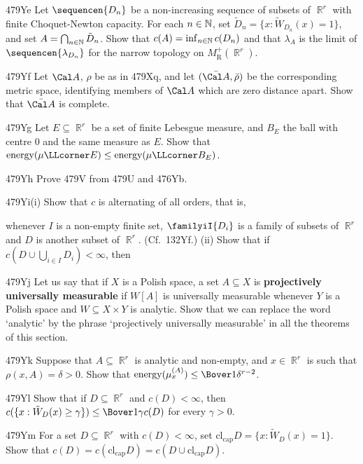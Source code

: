 {\spheader 479Ye
Let $\sequencen{D_n}$ be a non-increasing sequence of
subsets of $\BbbR^r$ with finite Choquet-Newton capacity.
For each $n\in\Bbb N$, set $\tilde D_n=\{x:\tilde W_{D_n}(x)=1\}$, and set
$A=\bigcap_{n\in\Bbb N}\tilde D_n$.   Show that
$c(A)=\inf_{n\in\Bbb N}c(D_n)$ and that $\lambda_A$ is the limit of
$\sequencen{\lambda_{D_n}}$ for the narrow topology on
$M^+_{\text{R}}(\BbbR^r)$.

\spheader 479Yf Let $\Cal A$, $\rho$ be as in 479Xq, and let
$(\bar{\Cal A},\bar\rho)$ be the corresponding metric space, identifying
members of $\Cal A$
which are zero distance apart.   Show that $\bar{\Cal A}$ is complete.

\spheader 479Yg
Let $E\subseteq\BbbR^r$ be a set of finite Lebesgue
measure, and $B_E$ the ball with centre $0$ and the same measure as $E$.
Show that $\energy(\mu\LLcorner E)\le\energy(\mu\LLcorner B_E)$.

\spheader 479Yh Prove 479V from 479U and 476Yb.

\spheader 479Yi(i) Show that $c$ is alternating of all orders, that is,


\noindent whenever $I$ is a
non-empty finite set, $\familyiI{D_i}$ is a family of
subsets of $\BbbR^r$ and $D$ is another subset of
$\BbbR^r$.   (Cf.\ 132Yf.)
(ii) Show that if $c(D\cup\bigcup_{i\in I}D_i)<\infty$, then


\spheader 479Yj Let us say that if $X$ is a Polish space, a set
$A\subseteq X$ is {\bf projectively universally measurable} if $W[A]$ is
universally measurable whenever $Y$ is a Polish space and
$W\subseteq X\times Y$ is analytic.   Show that we can replace
the word `analytic' by the phrase `projectively universally measurable' in
all the theorems of this section.

\spheader 479Yk Suppose that $A\subseteq\BbbR^r$ is analytic and non-empty,
and $x\in\BbbR^r$ is such that $\rho(x,A)=\delta>0$.
Show that $\energy(\mu^{(A)}_x)\le\Bover1{\delta^{r-2}}$.

\def\clcap{\text{cl}_{\text{cap}}}
\spheader 479Yl Show that if $D\subseteq\BbbR^r$ and $c(D)<\infty$, then
$c(\{x:\tilde W_D(x)\ge\gamma\})\le\Bover1{\gamma}c(D)$ for every
$\gamma>0$.

\spheader 479Ym
For a set $D\subseteq\BbbR^r$ with $c(D)<\infty$, set
$\clcap D=\{x:\tilde W_D(x)=1\}$.   Show that
$c(D)=c(\clcap D)=c(D\cup\clcap D)$.
}%

